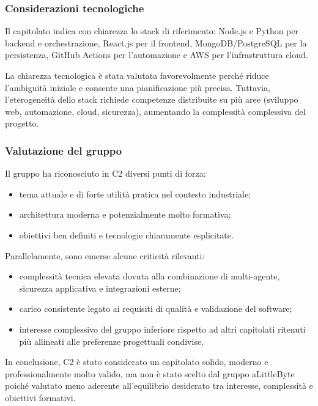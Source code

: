\documentclass[a4paper,12pt]{article}
\begin{document}
\subsubsection{Considerazioni tecnologiche}

Il capitolato indica con chiarezza lo stack di riferimento: Node.js e Python per backend e orchestrazione, React.js per il frontend, MongoDB/PostgreSQL per la persistenza, GitHub Actions per l'automazione e AWS per l'infrastruttura cloud.

La chiarezza tecnologica è stata valutata favorevolmente perché riduce l'ambiguità iniziale e consente una pianificazione più precisa. Tuttavia, l'eterogeneità dello stack richiede competenze distribuite su più aree (sviluppo web, automazione, cloud, sicurezza), aumentando la complessità complessiva del progetto.

\subsubsection{Valutazione del gruppo}

Il gruppo ha riconosciuto in C2 diversi punti di forza:

\begin{itemize}
    \item tema attuale e di forte utilità pratica nel contesto industriale;
    \item architettura moderna e potenzialmente molto formativa;
    \item obiettivi ben definiti e tecnologie chiaramente esplicitate.
\end{itemize}

Parallelamente, sono emerse alcune criticità rilevanti:

\begin{itemize}
    \item complessità tecnica elevata dovuta alla combinazione di multi-agente, sicurezza applicativa e integrazioni esterne;
    \item carico consistente legato ai requisiti di qualità e validazione del software;
    \item interesse complessivo del gruppo inferiore rispetto ad altri capitolati ritenuti più allineati alle preferenze progettuali condivise.
\end{itemize}

In conclusione, C2 è stato considerato un capitolato solido, moderno e professionalmente molto valido, ma non è stato scelto dal gruppo aLittleByte poiché valutato meno aderente all'equilibrio desiderato tra interesse, complessità e obiettivi formativi.
\end{document}
